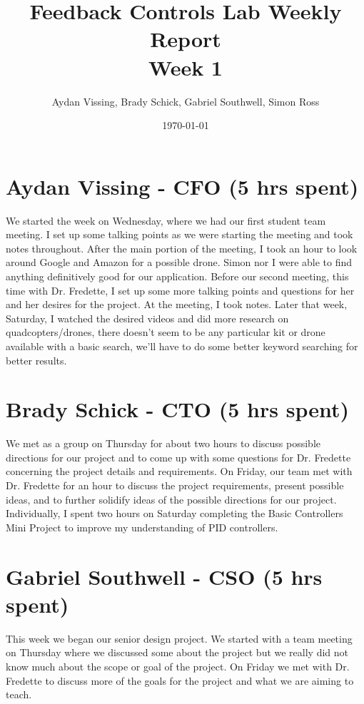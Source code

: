 \documentclass[12pt, titlepage]{article}
\title{Feedback Controls Lab Weekly Report \\ \normalsize{Week 1}}
\author{Aydan Vissing, Brady Schick, Gabriel Southwell, Simon Ross}
\date{\today}
\begin{document}
\maketitle

\section*{Aydan Vissing - CFO (5 hrs spent)}

We started the week on Wednesday, where we had our first student team meeting. I set up some talking points as we were starting the meeting and took notes throughout. After the main portion of the meeting, I took an hour to look around Google and Amazon for a possible drone. Simon nor I were able to find anything definitively good for our application. Before our second meeting, this time with Dr. Fredette, I set up some more talking points and questions for her and her desires for the project. At the meeting, I took notes. Later that week, Saturday, I watched the desired videos and did more research on quadcopters/drones, there doesn’t seem to be any particular kit or drone available with a basic search, we’ll have to do some better keyword searching for better results. 

\section*{Brady Schick - CTO (5 hrs spent)}

We met as a group on Thursday for about two hours to discuss possible directions for our project and to come up with some questions for Dr. Fredette concerning the project details and requirements. On Friday, our team met with Dr. Fredette for an hour to discuss the project requirements, present possible ideas, and to further solidify ideas of the possible directions for our project. Individually, I spent two hours on Saturday completing the Basic Controllers Mini Project to improve my understanding of PID controllers.

\section*{Gabriel Southwell - CSO (5 hrs spent)}

This week we began our senior design project. We started with a team meeting on Thursday where we discussed some about the project but we really did not know much about the scope or goal of the project. On Friday we met with Dr. Fredette to discuss more of the goals for the project and what we are aiming to teach. \\
\end{document}
